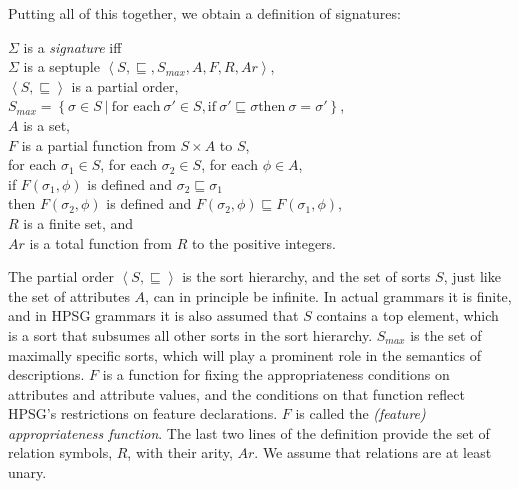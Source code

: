 \documentclass[output=paper
                ,modfonts
                ,nonflat
	        ,collection
	        ,collectionchapter
	        ,collectiontoclongg
 	        ,biblatex
                ,babelshorthands
                ,newtxmath
                ,draftmode
                ,colorlinks, citecolor=brown
]{./langsci/langscibook}
\begin{document}
{Putting all of this together, we obtain a definition of signatures:

\begin{mydef}\label{def-signature}
  $\Sigma$ is a \emph{signature} iff\\
  $\Sigma$ is a septuple $\left<S,\sqsubseteq,S_{max},A,F,R,Ar\right>$,\\
  $\left<S,\sqsubseteq\right>$ is a partial order,\\
  $S_{max} = \left\{\sigma\in S\ |\ \mbox{for each}\ \sigma' \in S, \mbox{if}\ \sigma'\sqsubseteq\sigma \mbox{then}\ \sigma=\sigma'\right\}$,\\
  $A$ is a set,\\
  $F$ is a partial function from $S\times A$ to $S$,\\
  for each $\sigma_1\in S$, for each $\sigma_2\in S$, for each $\phi\in A$,\\
  \hspace*{.5cm} if $F(\sigma_1,\phi)$ is defined and $\sigma_2\sqsubseteq\sigma_1$\\
  \hspace*{.5cm} then $F(\sigma_2,\phi)$ is defined and
             $F(\sigma_2,\phi)\sqsubseteq F(\sigma_1,\phi)$,\\
  $R$ is a finite set, and\\
  $Ar$ is a total function from $R$ to the positive integers.
\end{mydef}

The partial order $\left<S,\sqsubseteq\right>$ is the sort hierarchy,
and the set of sorts $S$, just like the set of attributes $A$, can in principle
be infinite. In actual grammars it is finite, and in HPSG grammars it is
also assumed that $S$ contains a top element, which is a sort that subsumes
all other sorts in the sort hierarchy. $S_{max}$ is the set of maximally
specific sorts, which will play a prominent role in the semantics of
descriptions. $F$ is a function for fixing the appropriateness conditions
on attributes and attribute values, and the conditions on that function
reflect HPSG's restrictions on feature declarations. $F$ is called the
\emph{(feature) appropriateness function}. The last two lines of
the definition provide the set of relation symbols, $R$, with their arity, $Ar$.
We assume that relations are at least unary.

}
\end{document}
